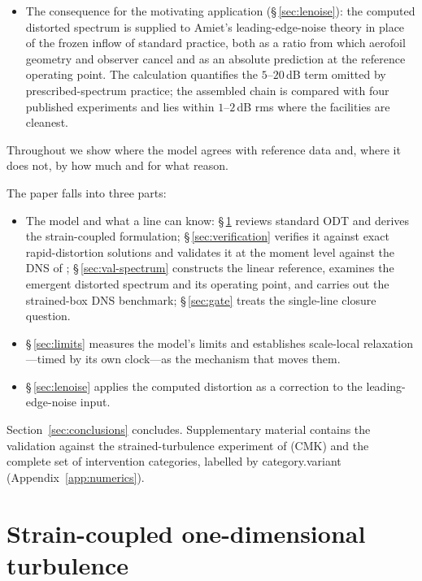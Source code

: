 \documentclass[lineno]{JFM-FLM_Au}
\begin{document}
\begin{itemize}
\item The consequence for the motivating application
(\S\,\ref{sec:lenoise}): the computed distorted spectrum is supplied to
Amiet's leading-edge-noise theory in place of the frozen inflow of standard
practice, both as a ratio from which aerofoil geometry and observer cancel
and as an absolute prediction at the reference operating point. The
calculation quantifies the $5$--$20$\,dB term omitted by prescribed-spectrum
practice; the assembled chain is compared with four published experiments
and lies within $1$--$2$\,dB rms where the facilities are cleanest.
\end{itemize}
Throughout we show where the model agrees with reference data and, where it
does not, by how much and for what reason.


The paper falls into three parts:
\begin{itemize}
\item The model and what a line can know: \S\,\ref{sec:formulation}
reviews standard ODT and derives the strain-coupled formulation;
\S\,\ref{sec:verification} verifies it against exact rapid-distortion
solutions and validates it at the moment level against the DNS of
\citet{LeeReynolds1985}; \S\,\ref{sec:val-spectrum} constructs the linear
reference, examines the emergent distorted spectrum and its operating
point, and carries out the strained-box DNS benchmark; \S\,\ref{sec:gate}
treats the single-line closure question.

\item \S\,\ref{sec:limits} measures the model's limits and establishes
scale-local relaxation---timed by its own clock---as the mechanism that
moves them.

\item \S\,\ref{sec:lenoise} applies the computed distortion as a
correction to the leading-edge-noise input.
\end{itemize}
Section~\ref{sec:conclusions} concludes. Supplementary material contains
the validation against the strained-turbulence experiment of
\citet{ChenMeneveauKatz2006} (CMK) and the complete set of intervention categories, labelled by category.variant (Appendix~\ref{app:numerics}).

\section{Strain-coupled one-dimensional turbulence}\label{sec:formulation}
\end{document}
